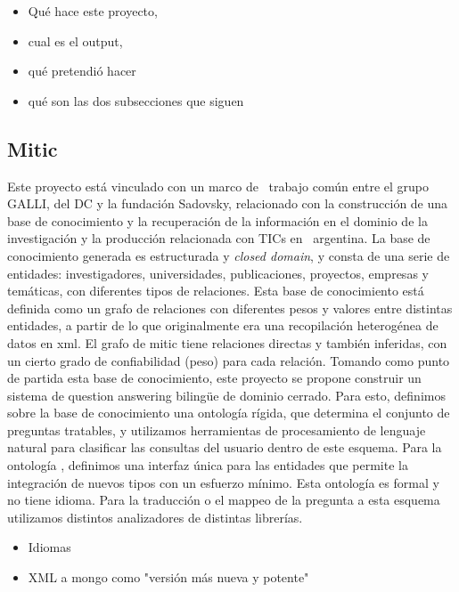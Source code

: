 \begin{itemize}
\item Qué hace este proyecto, 
\item cual es el output, 
\item qué pretendió hacer
\item qué son las dos subsecciones que siguen
\end{itemize}



\subsection{Mitic}

Este proyecto está vinculado con un marco de \ trabajo com\'un entre el
grupo GALLI, del DC y la fundaci\'on Sadovsky, relacionado con la construcción de una base de conocimiento
 y la recuperaci\'on de la informaci\'on en el dominio de la investigaci\'on y la
producci\'on relacionada con TICs en \ argentina. La base de
conocimiento generada es estructurada y \textit{closed domain}, y consta de
una serie de entidades: investigadores, universidades, publicaciones,
proyectos, empresas y tem\'aticas, con diferentes tipos de relaciones.
Esta base de conocimiento está definida como un grafo de relaciones con diferentes pesos y valores entre
distintas entidades, a partir de lo que originalmente era una
recopilaci\'on heterog\'enea de datos en xml. El grafo de mitic
tiene relaciones directas y también inferidas, con un cierto grado
de confiabilidad (peso) para cada relación. Tomando como punto de
partida esta base de conocimiento, este proyecto se propone construir
un sistema de question answering biling\"ue de dominio cerrado.
Para esto, definimos sobre la base de conocimiento una ontolog\'ia
r\'igida, que determina el conjunto de preguntas tratables, y
utilizamos herramientas de procesamiento de lenguaje natural para
clasificar las consultas del usuario dentro de este esquema. Para la
ontolog\'ia , definimos una interfaz \'unica para las entidades que
permite la integraci\'on de nuevos tipos con un esfuerzo m\'inimo. 
Esta ontolog\'ia es formal y no tiene idioma. Para la
traducci\'on o el mappeo de la pregunta a esta esquema utilizamos distintos
analizadores de distintas librer\'ias.

\begin{itemize}
\item Idiomas
\item XML a mongo como "versión más nueva y potente"
\end{itemize}

